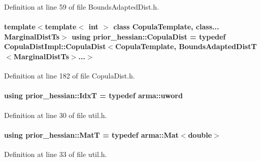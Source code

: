 Definition at line 59 of file Bounds\+Adapted\+Dist.\+h.

\paragraph[{\texorpdfstring{Copula\+Dist}{CopulaDist}}]{\setlength{\rightskip}{0pt plus 5cm}template$<$template$<$ int $>$ class Copula\+Template, class... Marginal\+Dist\+Ts$>$ using {\bf prior\+\_\+hessian\+::\+Copula\+Dist} = typedef {\bf Copula\+Dist\+Impl\+::\+Copula\+Dist}$<$Copula\+Template, {\bf Bounds\+Adapted\+DistT}$<$Marginal\+Dist\+Ts$>$...$>$}\hypertarget{namespaceprior__hessian_a40a0589f5be3c61e4c4854fcefe8855f}{}\label{namespaceprior__hessian_a40a0589f5be3c61e4c4854fcefe8855f}


Definition at line 182 of file Copula\+Dist.\+h.

\paragraph[{\texorpdfstring{IdxT}{IdxT}}]{\setlength{\rightskip}{0pt plus 5cm}using {\bf prior\+\_\+hessian\+::\+IdxT} = typedef arma\+::uword}\hypertarget{namespaceprior__hessian_aa8d589f74e88bfa3b5750118acd1ab78}{}\label{namespaceprior__hessian_aa8d589f74e88bfa3b5750118acd1ab78}


Definition at line 30 of file util.\+h.

\paragraph[{\texorpdfstring{MatT}{MatT}}]{\setlength{\rightskip}{0pt plus 5cm}using {\bf prior\+\_\+hessian\+::\+MatT} = typedef arma\+::\+Mat$<$double$>$}\hypertarget{namespaceprior__hessian_aab58331a34ed4ef22b6022564fe74be3}{}\label{namespaceprior__hessian_aab58331a34ed4ef22b6022564fe74be3}


Definition at line 33 of file util.\+h.

